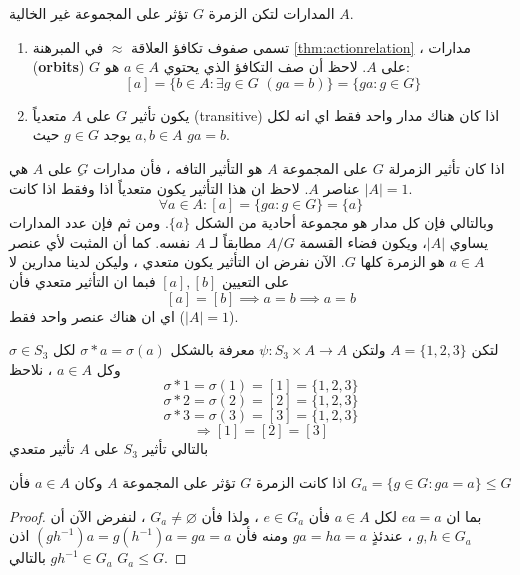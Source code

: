 \begin{definition}{المدارات}{\cite{ref3}}
	لتكن الزمرة $G$ تؤثر على المجموعة غير الخالية $A$.
	\begin{enumerate}[label=(\alph*)]
		\item تسمى صفوف تكافؤ العلاقة $\approx$ في المبرهنة \ref{thm:actionrelation} ، مدارات (\textbf{orbits}) $G$ على $A$.
		\linebreak لاحظ أن صف التكافؤ الذي يحتوي $a\in A$ هو:
		\[
		[a] = \{ b\in A : \exists g\in G \,\,( ga = b)\} = \{ga : g\in G\}
		\]
		\item يكون تأثير $G$ على $A$ متعدياً (transitive) اذا كان هناك مدار واحد فقط اي انه لكل $a, b\in A$ يوجد $g\in G$ حيث 
		$ga=b$.
	\end{enumerate}
\end{definition}

\begin{example}
	اذا كان تأثير الزمرلة $G$ على المجموعة $A$ هو التأثير التافه ، فأن مدارات $ِG$ على $A$ هي عناصر $A$. لاحظ ان هذا التأثير يكون متعدياً اذا وفقط اذا كانت $|A|=1 $. 
	\[
	\forall a \in A : [a] = \{ga : g\in G\} = \{a\}
	\]
	وبالتالي فإن كل مدار هو مجموعة أحادية من الشكل \( \{a\} \). ومن ثم فإن عدد المدارات يساوي \( |A| \)، ويكون فضاء القسمة \( A/G \) مطابقاً لـ \( A \) نفسه. كما أن المثبت لأي عنصر \( a \in A \) هو الزمرة كلها \( G \). الآن نفرض ان التأثير يكون متعدي ، وليكن لدينا مدارين لا على التعيين 
	$[a], [b]$ فبما ان التأثير متعدي فأن
	\[
	[a] = [b] \implies {a} = {b} \implies a=b
	\]
	اي ان هناك عنصر واحد فقط ($|A|=1 $).
\end{example}

\begin{example}
	لتكن 
	$A = \{1,2,3\}$ ولتكن $\psi : S_3 \times A \to A$ معرفة بالشكل
	$\sigma * a = \sigma(a)$ لكل $\sigma \in S_3$ وكل $a\in A$ ، نلاحظ
	\[
	\sigma * 1 = \sigma(1) = [1] = \{1,2,3\} 
	\]
	\[
	\sigma * 2 = \sigma(2) = [2] = \{1,2,3\} 
	\]
	\[
	\sigma * 3 = \sigma(3) = [3] = \{1,2,3\} 
	\]
	\[
	\Rightarrow [1] = [2] = [3]
	\]
	بالتالي تأثير $S_3 $ على $A$ تأثير متعدي
\end{example}

\begin{theorem}
	اذا كانت الزمرة $G$ تؤثر على المجموعة $A$ وكان $a\in A$ فأن
	$G_a = \{g\in G : ga=a\} \le G$
\end{theorem}
\begin{proof}
	بما ان $ea=a$ لكل $a\in A$ فأن $e\in G_a$ ، ولذا فأن $G_a\neq\varnothing$ ، لنفرض الآن أن $g,h\in G_a$ ، عندئذٍ $ga=ha=a$ ومنه فأن 
	$(gh^{-1})a=g(h^{-1})a=ga=a$ اذن $gh^{-1}\in G_a$ بالتالي $G_a \le G$. 
\end{proof}

